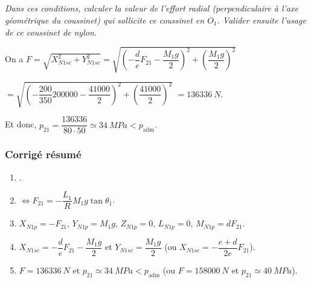 \begin{multicols}{2}
\subparagraph{}\textit{Dans ces conditions, calculer la valeur de l’effort radial (perpendiculaire à l’axe géométrique du coussinet) qui sollicite ce coussinet en $O_1$.
Valider ensuite l’usage de ce coussinet de nylon.}
\ifprof
\begin{corrige}
On a 
$F = \sqrt{X_{N1sc}^2+Y_{N1sc}^2}
= \sqrt{\left(-\dfrac{d}{e}F_{21} - \dfrac{M_1g}{2} \right)^2+\left( \dfrac{M_1g}{2}\right)^2}$

$= \sqrt{\left(-\dfrac{200}{350}200000 -  \dfrac{41000}{2}\right)^2+\left( \dfrac{41000}{2}\right)^2}$
$=\SI{136336}{N}$.

Et donc, $p_{21}=\dfrac{136336}{80\cdot 50}\simeq \SI{34}{MPa}<p_{\text{adm}}$.
\end{corrige}
\else
\fi

\ifcolle
\else
\ifprof
\else
\subsubsection*{Corrigé résumé}
\footnotesize
\begin{enumerate}
\item .
\item $\Leftrightarrow F_{21}=-\dfrac{L_1}{R} M_1g\tan\theta_1 $.
\item $X_{N1p} = - F_{21}$, $Y_{N1p}= M_1g$, $Z_{N1p}=0$, $
 L_{N1p} = {0}$, $M_{N1p} =dF_{21}$.
\item $X_{N1sc}=-\dfrac{d}{e}F_{21} - \dfrac{M_1g}{2}$ et $Y_{N1sc} = \dfrac{M_1g}{2}$ (ou $X_{N1sc}=-\dfrac{e+d}{2e}F_{21}$).
\item $F=\SI{136336}{N}$ et $p_{21}\simeq \SI{34}{MPa}<p_{\text{adm}}$ (ou $F=\SI{158000}{N}$ et $p_{21}\simeq \SI{40}{MPa}$).
\end{enumerate}
\normalsize
\fi
\fi


\ifprof
\else
\end{multicols}
\fi




